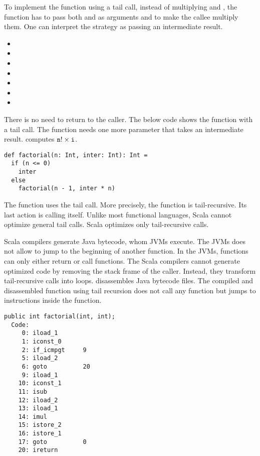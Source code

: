 To implement the function using a tail call, instead of multiplying  and
, the function has to pass both  and 
as arguments and to make the callee multiply them. One can interpret the strategy
as passing an intermediate result.

\begin{itemize}
\item {}
\item {}
\item {}
\item {}
\item {}
\item {}
\item {}
\end{itemize}

There is no need to return to the caller. The below code shows the
 function with a tail call. The function needs one more parameter
that takes an intermediate result.  computes \(\texttt{n}!\times
\texttt{i}\).

\begin{verbatim}
def factorial(n: Int, inter: Int): Int =
  if (n <= 0)
    inter
  else
    factorial(n - 1, inter * n)
\end{verbatim}

The function uses the tail call. More precisely, the function is
tail-recursive. Its last action is calling itself. Unlike most functional
languages, Scala cannot optimize general tail calls. Scala optimizes only
tail-recursive calls.

Scala compilers generate Java bytecode, whom JVMs execute. The JVMs does not
allow to jump to the beginning of another function. In the JVMs, functions can
only either return or call functions. The Scala compilers cannot generate
optimized code by removing the stack frame of the caller. Instead, they transform
tail-recursive calls into loops.  disassembles Java bytecode files.
The compiled and disassembled  function using tail recursion does
not call any function but jumps to instructions inside the function.

\begin{verbatim}
public int factorial(int, int);
  Code:
     0: iload_1
     1: iconst_0
     2: if_icmpgt     9
     5: iload_2
     6: goto          20
     9: iload_1
    10: iconst_1
    11: isub
    12: iload_2
    13: iload_1
    14: imul
    15: istore_2
    16: istore_1
    17: goto          0
    20: ireturn
\end{verbatim}

